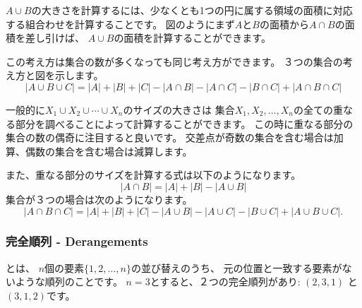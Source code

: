 $A \cup B$の大きさを計算するには、少なくとも1つの円に属する領域の面積に対応する組合わせを計算することです。
図のようにまず$A$と$B$の面積から$A \cap B$の面積を差し引けば、
$A \cup B$の面積を計算することができます。

この考え方は集合の数が多くなっても同じ考え方ができます。
３つの集合の考え方と図を示します。
\[ |A \cup B \cup C| = |A| + |B| + |C| - |A \cap B|  - |A \cap C|  - |B \cap C| + |A \cap B \cap C| \]

\begin{center}
\end{center}

一般的に$X_1 \cup X_2 \cup \cdots \cup X_n$のサイズの大きさは
集合$X_1,X_2,\ldots,X_n$の全ての重なる部分を調べることによって計算することができます。
この時に重なる部分の集合の数の偶奇に注目すると良いです。
交差点が奇数の集合を含む場合は加算、偶数の集合を含む場合は減算します。

また、重なる部分のサイズを計算する式は以下のようになります。
\[ |A \cap B| = |A| + |B| - |A \cup B|\]
集合が３つの場合は次のようになります。
\[ |A \cap B \cap C| = |A| + |B| + |C| - |A \cup B|  - |A \cup C|  - |B \cup C| + |A \cup B \cup C| .\]

\subsubsection{完全順列 - Derangements}


とは、
$n$個の要素$\{1,2,\ldots,n\}$の並び替えのうち、
元の位置と一致する要素がないような順列のことです。
$n=3$とすると、２つの完全順列があり: $(2,3,1)$ と $(3,1,2)$です。

